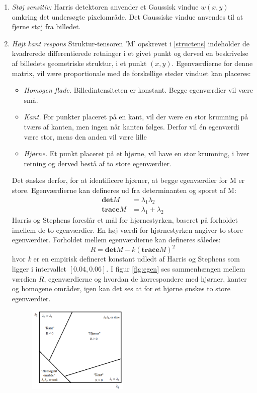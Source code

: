 \begin{enumerate}
\item{\textit{Støj sensitiv:} Harris detektoren anvender et Gaussisk vindue $w(x,y)$ omkring det undersøgte pixelområde. Det Gaussiske vindue anvendes til at fjerne støj fra billedet.}
\item{\textit{Højt kant respons} Struktur-tensoren 'M' opskrevet i \eqref{structens} indeholder de kvadrerede differentierede retninger i et givet punkt og derved en beskrivelse af billedets geometriske struktur, i et punkt $(x,y)$. Egenværdierne for denne matrix, vil være proportionale med de forskellige steder vinduet kan placeres:
\begin{itemize}
\item{ \textit{Homogen flade.} Billedintensiteten er konstant. Begge egenværdier vil være små.}
\item{\textit{Kant.} For punkter placeret på en kant, vil der være en stor krumning på tværs af kanten, men ingen når kanten følges. Derfor vil én egenværdi være stor, mens den anden vil være lille}
\item{\textit{Hjørne.} Et punkt placeret på et hjørne, vil have en stor krumning, i hver retning og derved bestå af to store egenværdier.}
\end{itemize}
Det ønskes derfor, for at identificere hjørner, at begge egenværdier for M er store. Egenværdierne kan defineres ud fra determinanten og sporet af M:
\begin{subequations}
\begin{align}
\textbf{det}M & = \lambda_1 \lambda_2 \\
\textbf{trace}M & = \lambda_1+\lambda_2
\end{align}
\end{subequations}
Harris og Stephens foreslår et mål for hjørnestyrken, baseret på forholdet imellem de to egenværdier. En høj værdi for hjørnestyrken angiver to store egenværdier. Forholdet mellem egenværdierne kan defineres således:
\begin{equation}
R = \textbf{det}M-k(\textbf{trace}M)^2
\label{rvalharris}
\end{equation}
hvor \textit{k} er en empirisk defineret konstant udledt af Harris og Stephens som ligger i intervallet $[0.04,0.06]$. I figur \ref{fig:egen} ses sammenhængen mellem værdien $R$, egenværdierne og hvordan de korrespondere med hjørner, kanter og homogene områder, igen kan det ses at for et hjørne ønskes to store egenværdier.
\begin{figure}[H]
    \centering
    \includegraphics[width=0.45\textwidth]{fig/26.png}

\end{figure}}
\end{enumerate}
